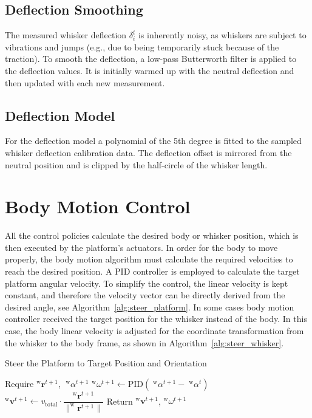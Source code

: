 \subsection{Deflection Smoothing}
The measured whisker deflection \(\delta_{i}^{t}\) is inherently noisy, as whiskers are subject to vibrations and jumps (e.g., due to being temporarily stuck because of the traction).
To smooth the deflection, a low-pass Butterworth filter is applied to the deflection values.
It is initially warmed up with the neutral deflection and then updated with each new measurement.

\subsection{Deflection Model}
For the deflection model a polynomial of the 5th degree is fitted to the sampled whisker deflection calibration data.
The deflection offset is mirrored from the neutral position and is clipped by the half-circle of the whisker length.

\section{Body Motion Control}
All the control policies calculate the desired body or whisker position, which is then executed by the platform's actuators.
In order for the body to move properly, the body motion algorithm must calculate the required velocities to reach the desired position.
A PID controller is employed to calculate the target platform angular velocity.
To simplify the control, the linear velocity is kept constant, and therefore the velocity vector can be directly derived from the desired angle, see Algorithm~\ref{alg:steer_platform}.
In some cases body motion controller received the target position for the whisker instead of the body.
In this case, the body linear velocity is adjusted for the coordinate transformation from the whisker to the body frame, as shown in Algorithm~\ref{alg:steer_whisker}.

\begin{algorithm}[htb]
    \caption{Steer the Platform to Target Position and Orientation}
    \begin{algorithmic}
        \State Require \(^{\mathrm{w}}\boldsymbol{r}^{t+1}\), \(\;^{\mathrm{w}}\alpha^{t+1}\)
        \State \(^{\mathrm{w}}\omega^{t+1} \gets \mathrm{PID}(\;^{\mathrm{w}}\alpha^{t+1} - \;^{\mathrm{w}}\alpha^{t})\)
        \State \(^{\mathrm{w}}\boldsymbol{v}^{t+1} \gets v_{\mathrm{total}} \cdot \dfrac{^{\mathrm{w}}\boldsymbol{r}^{t+1}}{\|^{\mathrm{w}}\boldsymbol{r}^{t+1}\|}\)
        \State Return \(^{\mathrm{w}}\boldsymbol{v}^{t+1}\), \(^{\mathrm{w}}\omega^{t+1}\)
    \end{algorithmic}
    \label{alg:steer_platform}
\end{algorithm}

